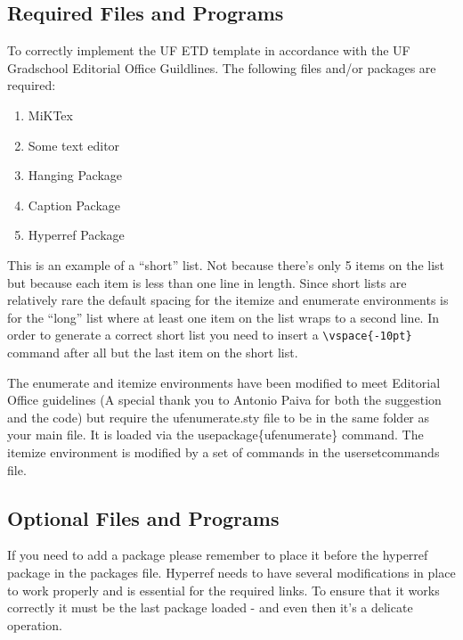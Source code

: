 \subsection{Required Files and Programs} %
To correctly implement the UF ETD \LaTeXe  template in accordance with the UF Gradschool Editorial Office Guildlines. The following files and/or packages are required: %
\begin{enumerate} %
    \item MiKTex \vspace{-10pt}%
    \item Some text editor \vspace{-10pt}
    \item Hanging Package \vspace{-10pt}%
    \item Caption Package \vspace{-10pt}%
    \item Hyperref Package %
 \end{enumerate} %
 This is an example of a ``short'' list. Not because there's only 5 items on the list but because each item is less than one line in length. Since short lists are relatively rare the default spacing for the itemize and enumerate environments is for the ``long'' list where at least one item on the list wraps to a second line. In order to generate a correct short list you need to insert a \verb=\vspace{-10pt}= command after all but the last item on the short list.

The enumerate and itemize environments have been modified to meet Editorial Office guidelines (A special thank you to Antonio Paiva for both the suggestion and the code) but require the ufenumerate.sty file to be in the same folder as your main file. It is loaded via the usepackage\{ufenumerate\} command. The itemize environment is modified by a set of commands in the usersetcommands file. 

\subsection{Optional Files and Programs}

If you need to add a package please remember to place it before the hyperref package in the packages file. Hyperref needs to have several modifications in place to work properly and is essential for the required links. To ensure that it works correctly it must be the last package loaded - and even then it's a delicate operation. 

